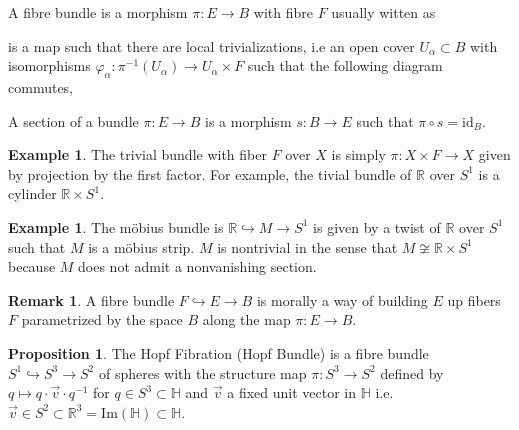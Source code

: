 \documentclass[12pt]{extarticle}
\newcommand{\R}{\mathbb{R}}
\newcommand{\id}{\mathrm{id}}
\renewcommand{\Im}[1]{\mathrm{Im}(#1)}
\theoremstyle{definition}
\newtheorem{proposition}[theorem]{Proposition}
\newtheorem{example}[theorem]{Example}
\newtheorem{remark}{Remark}
\newenvironment{definition}[1][Definition:]{\begin{trivlist}
\item[\hskip \labelsep {\bfseries #1}]}{\end{trivlist}}
\renewcommand{\H}{\mathbb{H}}
\begin{document}
\begin{definition}
A fibre bundle is a morphism $\pi : E \to B$ with fibre $F$ usually witten as
\begin{center}
\end{center}
is a map such that there are local trivializations, i.e an open cover $U_\alpha \subset B$ with isomorphisms $\varphi_\alpha : \pi^{-1}(U_\alpha) \to U_\alpha \times F$ such that the following diagram commutes,
\begin{center}
\end{center}
\end{definition}

\begin{definition}
A section of a bundle $\pi : E \to B$ is a morphism $s : B \to E$ such that $\pi \circ s = \id_B$. 
\end{definition}

\begin{example}
The trivial bundle with fiber $F$ over $X$ is simply $\pi : X \times F \to X$ given by projection by the first factor. For example, the tivial bundle of $\R$ over $S^1$ is a cylinder $\R \times S^1$.  
\end{example}

\begin{example}
The m\"{o}bius bundle is $\R \hookrightarrow M \to S^1$ is given by a twist of $\R$ over $S^1$ such that $M$ is a m\"{o}bius strip. $M$ is nontrivial in the sense that $M \not\cong \R \times S^1$ because $M$ does not admit a nonvanishing section.
\end{example}

\begin{remark}
A fibre bundle $F \hookrightarrow E \to B$ is morally a way of building $E$ up fibers $F$ parametrized by the space $B$ along the map $\pi : E \to B$. 
\end{remark}

\begin{proposition}
The Hopf Fibration (Hopf Bundle) is a fibre bundle $S^1 \hookrightarrow S^3 \to S^2$ of spheres with the structure map $\pi : S^3 \to S^2$ defined by $q \mapsto q \cdot \vec{v} \cdot q^{-1}$ for $q \in S^3 \subset \H$ and $\vec{v}$ a fixed unit vector in $\H$ i.e. $\vec{v} \in S^2 \subset \R^3 = \Im{\H} \subset \H$.  
\end{proposition}
\end{document}
